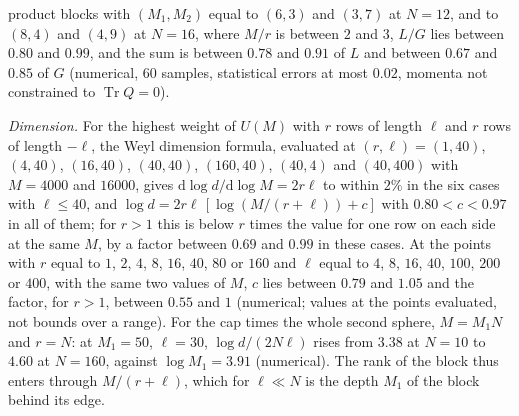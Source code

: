 product blocks with \((M_1,M_2)\) equal to \((6,3)\) and \((3,7)\) at \(N=12\), and to \((8,4)\) and \((4,9)\) at \(N=16\), where \(M/r\) is between \(2\) and \(3\), \(L/G\) lies between \(0.80\) and \(0.99\), and the sum is between \(0.78\) and \(0.91\) of \(L\) and between \(0.67\) and \(0.85\) of \(G\) (numerical, \(60\) samples, statistical errors at most \(0.02\), momenta not constrained to \(\operatorname{Tr}Q=0\)).

\emph{Dimension.} For the highest weight of \(U(M)\) with \(r\) rows of length \(\ell\) and \(r\) rows of length \(-\ell\), the Weyl dimension formula, evaluated at \((r,\ell)=(1,40)\), \((4,40)\), \((16,40)\), \((40,40)\), \((160,40)\), \((40,4)\) and \((40,400)\) with \(M=4000\) and \(16000\), gives \(\mathrm d\log d/\mathrm d\log M=2r\ell\) to within \(2\%\) in the six cases with \(\ell\le40\), and \(\log d=2r\ell\,[\log(M/(r+\ell))+c]\) with \(0.80<c<0.97\) in all of them; for \(r>1\) this is below \(r\) times the value for one row on each side at the same \(M\), by a factor between \(0.69\) and \(0.99\) in these cases. At the points with \(r\) equal to \(1\), \(2\), \(4\), \(8\), \(16\), \(40\), \(80\) or \(160\) and \(\ell\) equal to \(4\), \(8\), \(16\), \(40\), \(100\), \(200\) or \(400\), with the same two values of \(M\), \(c\) lies between \(0.79\) and \(1.05\) and the factor, for \(r>1\), between \(0.55\) and \(1\) (numerical; values at the points evaluated, not bounds over a range). For the cap times the whole second sphere, \(M=M_1N\) and \(r=N\): at \(M_1=50\), \(\ell=30\), \(\log d/(2N\ell)\) rises from \(3.38\) at \(N=10\) to \(4.60\) at \(N=160\), against \(\log M_1=3.91\) (numerical). The rank of the block thus enters through \(M/(r+\ell)\), which for \(\ell\ll N\) is the depth \(M_1\) of the block behind its edge.

